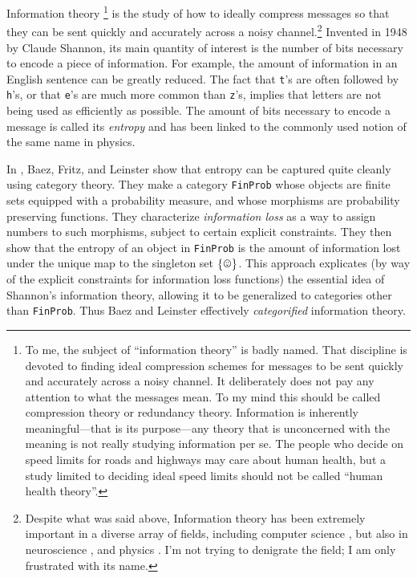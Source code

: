 \documentclass[CT4S-EN-RU]{subfiles}
\begin{document}
\begin{blockENG}
Information theory 
\footnote{To me, the subject of “information theory” is badly named. That discipline is devoted to finding ideal compression schemes for messages to be sent quickly and accurately across a noisy channel. It deliberately does not pay any attention to what the messages mean. To my mind this should be called compression theory or redundancy theory. Information is inherently meaningful—that is its purpose—any theory that is unconcerned with the meaning is not really studying information per se. The people who decide on speed limits for roads and highways may care about human health, but a study limited to deciding ideal speed limits should not be called “human health theory”.} 
is the study of how to ideally compress messages so that they can be sent quickly and accurately across a noisy channel.\footnote{Despite what was said above, Information theory has been extremely important in a diverse array of fields, including computer science \cite{MacK}, but also in neuroscience \cite{Bar}, \cite{Lin} and physics \cite{Eve}. I'm not trying to denigrate the field; I am only frustrated with its name.} Invented in 1948 by Claude Shannon, its main quantity of interest is the number of bits necessary to encode a piece of information. For example, the amount of information in an English sentence can be greatly reduced. The fact that {\tt t}'s are often followed by {\tt h}'s, or that {\tt e}'s are much more common than {\tt z}'s, implies that letters are not being used as efficiently as possible. The amount of bits necessary to encode a message is called its {\em entropy} and has been linked to the commonly used notion of the same name in physics. 
\end{blockENG}

\begin{blockRUS}
\end{blockRUS}

\begin{blockENG}
In \cite{BFL}, Baez, Fritz, and Leinster show that entropy can be captured quite cleanly using category theory. They make a category {\tt FinProb} whose objects are finite sets equipped with a probability measure, and whose morphisms are probability preserving functions. They characterize {\em information loss} as a way to assign numbers to such morphisms, subject to certain explicit constraints. They then show that the entropy of an object in {\tt FinProb} is the amount of information lost under the unique map to the singleton set $\singleton$. This approach explicates (by way of the explicit constraints for information loss functions) the essential idea of Shannon's information theory, allowing it to be generalized to categories other than {\tt FinProb}. Thus Baez and Leinster effectively {\em categorified} information theory.
\end{blockENG}
\end{document}
